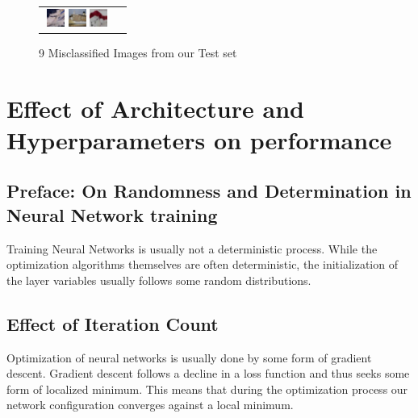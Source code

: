 \documentclass{article}
\begin{document}
\begin{figure}
\begin{tabular}{cc}
\includegraphics[width=0.27\textwidth]{imgs/mis7.png}    \includegraphics[width=0.27\textwidth]{imgs/mis8.png}    \includegraphics[width=0.27\textwidth]{imgs/mis9.png} \\
\end{tabular}
\caption{9 Misclassified Images from our Test set}\label{misclassified}
\end{figure}

\section{Effect of Architecture and Hyperparameters on performance}


\subsection{Preface: On Randomness and Determination in Neural Network training}
Training Neural Networks is usually not a deterministic process. While the optimization algorithms themselves are often deterministic, the initialization of the layer variables usually follows some random distributions.


\subsection{Effect of Iteration Count}
Optimization of neural networks is usually done by some form of gradient descent. Gradient descent follows a decline in a loss function and thus seeks some form of localized minimum. This means that during the optimization process our network configuration converges against a local minimum.
\end{document}
